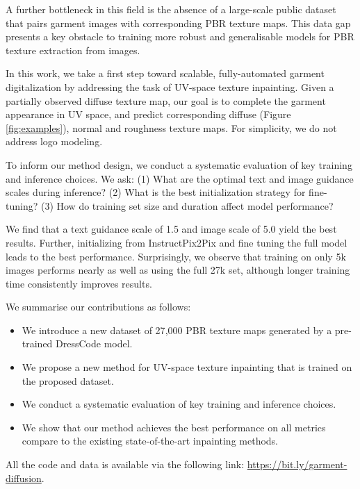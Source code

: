 \documentclass[11pt,twocolumn]{article}
\begin{document}
A further bottleneck in this field is the absence of a large-scale public dataset that pairs 
garment images with corresponding PBR texture maps. This data gap presents a key obstacle to 
training more robust and generalisable models for PBR texture extraction from images.

In this work, we take a first step toward scalable, fully-automated garment digitalization by addressing the 
task of UV-space texture inpainting. Given a partially observed diffuse texture map, our goal is to complete 
the garment appearance in UV space, and predict corresponding diffuse (Figure \ref{fig:examples}), normal and roughness 
texture maps. For simplicity, we do not address logo modeling.

To inform our method design, we conduct a systematic evaluation of key training and inference choices. 
We ask: (1) What are the optimal text and image guidance scales during inference? (2) What is the best initialization strategy for fine-tuning? (3) 
How do training set size and duration affect model performance?

We find that a text guidance scale of 1.5 and image scale of 5.0 yield the best results. 
Further, initializing from InstructPix2Pix and fine tuning the full model leads to the best performance. 
Surprisingly, we observe that training on only 5k images performs nearly as well as using the full 27k set, 
although longer training time consistently improves results.

We summarise our contributions as follows:
\begin{itemize}[itemsep=2pt, topsep=2pt]
  \item We introduce a new dataset of 27{,}000 PBR texture maps generated by a pre-trained DressCode \cite{dresscode} model.
  \item We propose a new method for UV-space texture inpainting that is trained on the proposed dataset.
  \item We conduct a systematic evaluation of key training and inference choices.
  \item We show that our method achieves the best performance on all metrics compare to the existing state-of-the-art inpainting methods.
\end{itemize}

All the code and data is available via the following link:
\url{https://bit.ly/garment-diffusion}.
\end{document}
